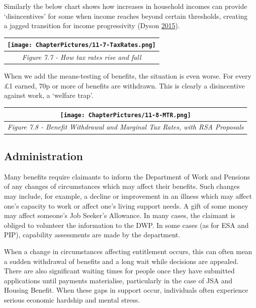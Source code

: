 \documentclass[]{tufte-handout}
\begin{document}
Similarly the below chart shows how increases in household incomes can
provide `disincentives' for some when income reaches beyond certain
thresholds, creating a jagged transition for income progressivity (Dyson
\protect\hyperlink{ref-Dyson2015}{2015}).

\begin{longtable}[]{@{}c@{}}
\toprule
\texttt{[image: ChapterPictures/11-7-TaxRates.png]}\tabularnewline
\midrule
\endhead
\emph{Figure 7.7 - How tax rates rise and fall}\tabularnewline
\bottomrule
\end{longtable}

When we add the means-testing of benefits, the situation is even worse.
For every £1 earned, 70p or more of benefits are withdrawn. This is
clearly a disincentive against work, a `welfare trap'.

\begin{longtable}[]{@{}c@{}}
\toprule
\begin{minipage}[b]{0.97\columnwidth}\centering
\texttt{[image: ChapterPictures/11-8-MTR.png]}\strut
\end{minipage}\tabularnewline
\midrule
\endhead
\begin{minipage}[t]{0.97\columnwidth}\centering
\emph{Figure 7.8 - Benefit Withdrawal and Marginal Tax Rates, with RSA
Proposals}\strut
\end{minipage}\tabularnewline
\bottomrule
\end{longtable}

\hypertarget{administration}{%
\subsection{Administration}\label{administration}}

Many benefits require claimants to inform the Department of Work and
Pensions of any changes of circumstances which may affect their
benefits. Such changes may include, for example, a decline or
improvement in an illness which may affect one's capacity to work or
affect one's living support needs. A gift of some money may affect
someone's Job Seeker's Allowance. In many cases, the claimant is obliged
to volunteer the information to the DWP. In some cases (as for ESA and
PIP), capability assessments are made by the department.

When a change in circumstances affecting entitlement occurs, this can
often mean a sudden withdrawal of benefits and a long wait while
decisions are appealed. There are also significant waiting times for
people once they have submitted applications until payments materialise,
particularly in the case of JSA and Housing Benefit. When these gaps in
support occur, individuals often experience serious economic hardship
and mental stress.
\end{document}
